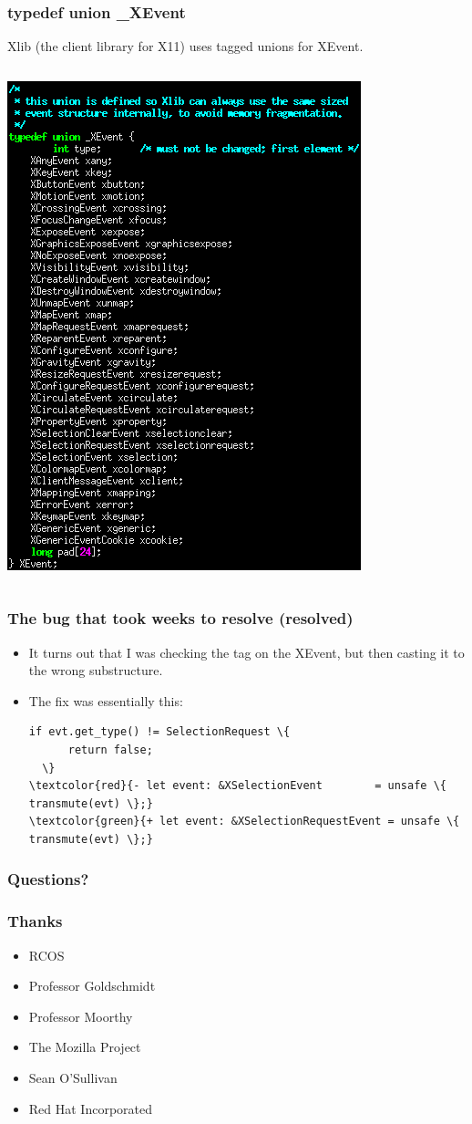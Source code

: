 \documentclass{beamer}
\begin{document}
\begin{frame}[fragile]
\frametitle{typedef union \_XEvent}
Xlib (the client library for X11) uses tagged unions for XEvent.
\begin{columns}
\begin{column}{0.5\textwidth}
\includegraphics[height=0.8\textheight]{typedef_union_xevent.png}
\end{column}
\end{columns}
\end{frame}

\begin{frame}[fragile]
\frametitle{The bug that took weeks to resolve (resolved)}
\begin{itemize}
\item
It turns out that I was checking the tag on the XEvent, but then casting it to the wrong substructure.
\item
The fix was essentially this:
\begin{Verbatim}[frame=single, fontsize=\scriptsize, commandchars=\\\{\}]
  if evt.get_type() != SelectionRequest \{
      return false;
  \}
\textcolor{red}{- let event: &XSelectionEvent        = unsafe \{ transmute(evt) \};}
\textcolor{green}{+ let event: &XSelectionRequestEvent = unsafe \{ transmute(evt) \};}
\end{Verbatim}
\end{itemize}
\end{frame}

\begin{frame}[fragile]
\frametitle{Questions?}
\end{frame}

\begin{frame}[fragile]
\frametitle{Thanks}
\begin{itemize}
\item RCOS
\item Professor Goldschmidt
\item Professor Moorthy
\item The Mozilla Project
\item Sean O'Sullivan
\item Red Hat Incorporated
\end{itemize}
\end{frame}
\end{document}
